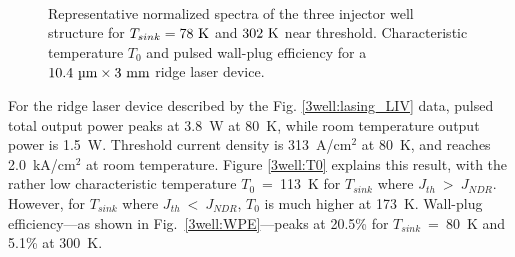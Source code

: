 \begin{figure}[tp]%
\centering%
%
\\%
\vspace*{-0.1in}%
%
\hfil%
%
\caption[Performance data for the three injector well structure]{  Representative normalized spectra of the three injector well structure for $T_{sink}=78~\textnormal{K}$ and $302~\textnormal{K}$ near threshold.  Characteristic temperature $T_0$  and pulsed wall-plug efficiency  for a $10.4~\tn{\um}\times3~\tn{mm}$ ridge laser device.}%
\label{3well:performance}%
\end{figure}

For the ridge laser device described by the Fig. \ref{3well:lasing_LIV} data, pulsed total output power peaks at 3.8~W at 80~K, while room temperature output power is 1.5~W.  Threshold current density is 313~A/cm$^2$ at 80~K, and reaches 2.0~kA/cm$^2$ at room temperature. Figure \ref{3well:T0} explains this result, with the rather low characteristic temperature $T_0$~=~113~K for $T_{sink}$ where $J_{th}~>~J_{NDR}$.  However, for $T_{sink}$ where $J_{th}~<~J_{NDR}$, $T_0$ is much higher at 173~K.  Wall-plug efficiency---as shown in Fig.~\ref{3well:WPE}---peaks at 20.5\% for $T_{sink}$~=~80~K and 5.1\% at 300~K.


